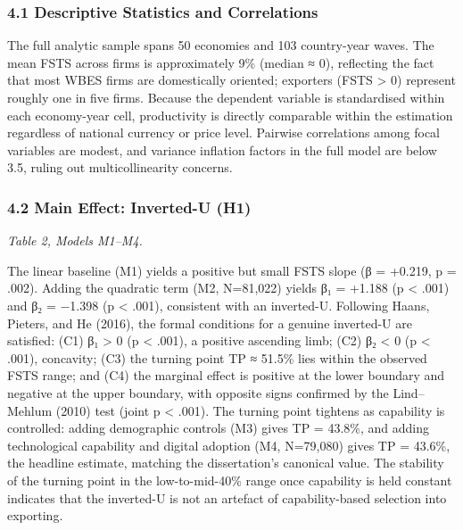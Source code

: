 \documentclass[
  12pt,a4paper]{article}
\begin{document}
\hypertarget{descriptive-statistics-and-correlations}{%
\subsubsection{4.1 Descriptive Statistics and
Correlations}\label{descriptive-statistics-and-correlations}}

The full analytic sample spans 50 economies and 103 country-year waves.
The mean FSTS across firms is approximately 9\% (median ≈ 0), reflecting
the fact that most WBES firms are domestically oriented; exporters (FSTS
\textgreater{} 0) represent roughly one in five firms. Because the
dependent variable is standardised within each economy-year cell,
productivity is directly comparable within the estimation regardless of
national currency or price level. Pairwise correlations among focal
variables are modest, and variance inflation factors in the full model
are below 3.5, ruling out multicollinearity concerns.

\hypertarget{main-effect-inverted-u-h1}{%
\subsubsection{4.2 Main Effect: Inverted-U
(H1)}\label{main-effect-inverted-u-h1}}

\emph{Table 2, Models M1--M4.}

The linear baseline (M1) yields a positive but small FSTS slope (β =
+0.219, p = .002). Adding the quadratic term (M2, N=81,022) yields β₁ =
+1.188 (p \textless{} .001) and β₂ = −1.398 (p \textless{} .001),
consistent with an inverted-U. Following Haans, Pieters, and He (2016),
the formal conditions for a genuine inverted-U are satisfied: (C1) β₁
\textgreater{} 0 (p \textless{} .001), a positive ascending limb; (C2)
β₂ \textless{} 0 (p \textless{} .001), concavity; (C3) the turning point
TP ≈ 51.5\% lies within the observed FSTS range; and (C4) the marginal
effect is positive at the lower boundary and negative at the upper
boundary, with opposite signs confirmed by the Lind--Mehlum (2010) test
(joint p \textless{} .001). The turning point tightens as capability is
controlled: adding demographic controls (M3) gives TP = 43.8\%, and
adding technological capability and digital adoption (M4, N=79,080)
gives TP = 43.6\%, the headline estimate, matching the dissertation's
canonical value. The stability of the turning point in the
low-to-mid-40\% range once capability is held constant indicates that
the inverted-U is not an artefact of capability-based selection into
exporting.
\end{document}

